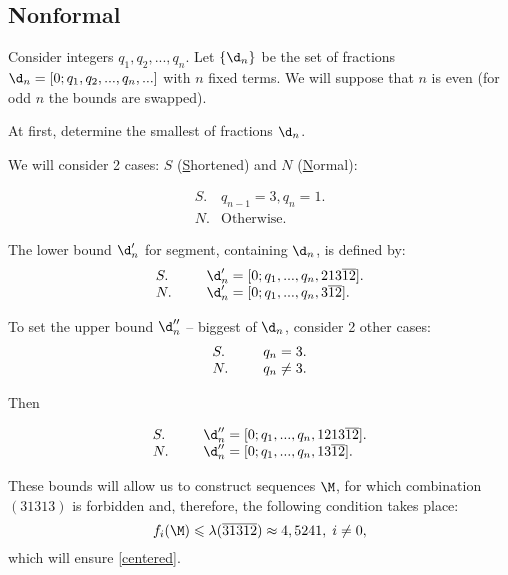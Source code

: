 \subsection{Nonformal}

Consider integers $q_1, q_2, ..., q_n$.
Let $\{\d_n\}$ be the set of fractions
$\d_n = [0; q_1, q_2, ..., q_n, ...]$ with $n$ fixed terms.
We will suppose that $n$ is even (for odd $n$ the bounds are swapped).

At first, determine the smallest of fractions $\d_n$.

We will consider 2 cases: $S$
(\underline{S}hortened) and $N$ (\underline{N}ormal):

\begin{equation}
	\label{left_shortened_normal}
	\begin{array}{ll}
		S. & q_{n-1} = 3, q_n = 1. \\
		N. & \text{Otherwise.}
	\end{array}
\end{equation}

The lower bound $\d_n'$ for segment, containing $\d_n$, is defined by:
\begin{equation}
	\begin{array}{ll}
		S. & \hspace*{15pt} \d_n' = [0; q_1, ..., q_n, 213\overline{12}]. \\
		N. & \hspace*{15pt} \d_n' = [0; q_1, ..., q_n, 3\overline{12}].
	\end{array}
\end{equation}

To set the upper bound $\d_n''$ -- biggest of $\d_n$, consider 2 other cases:
\begin{equation}
	\begin{array}{ll}
		S. & \hspace*{15pt} q_{n} = 3.\\
		N. & \hspace*{15pt} q_{n} \ne 3.
	\end{array}
\end{equation}

Then

\begin{equation}
	\begin{array}{ll}
		S. & \hspace*{15pt} \d_n'' = [0; q_1, ..., q_n, 1213\overline{12}]. \\
		N. & \hspace*{15pt} \d_n'' = [0; q_1, ..., q_n, 13\overline{12}].
	\end{array}
\end{equation}

These bounds will allow us to construct sequences $\M$,
for which combination $(31313)$ is forbidden and, therefore,
the following condition takes place:
\begin{equation}
	f_i(\M) \leqslant \lambda(\overline{31312}) \approx 4,5241, \;
	i \ne 0,
\end{equation}
which will ensure \ref{centered}.
